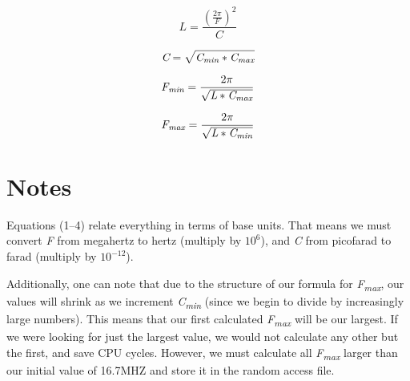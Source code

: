 \documentclass[12pt]{article}
\begin{document}
    \par %

    \begin{equation}
        \textit{L} = \frac{(\frac{2\pi}{\textit{F}})^2}{\textit{C}}
    \end{equation}

    \begin{equation}
        \textit{C} = \sqrt{\textit{C\textsubscript{min}}*\textit{C\textsubscript{max}}}
    \end{equation}

    \begin{equation}
        \textit{F\textsubscript{min}} = \frac{2\pi}{\sqrt{\textit{L}*\textit{C\textsubscript{max}}}}
    \end{equation}

    \begin{equation}
        \textit{F\textsubscript{max}} = \frac{2\pi}{\sqrt{\textit{L}*\textit{C\textsubscript{min}}}}
    \end{equation}


\section*{Notes}
    Equations (1--4) relate everything in terms of base units. That means we must convert \textit{F} from megahertz to hertz (multiply by $10^6$), and \textit{C} from picofarad to farad (multiply by $10^{-12}$).

    \par Additionally, one can note that due to the structure of our formula for \textit{F\textsubscript{max}}, our values will shrink as we increment \textit{C\textsubscript{min}} (since we begin to divide by increasingly large numbers). This means that our first calculated  \textit{F\textsubscript{max}} will be our largest. If we were looking for just the largest value, we would not calculate any other but the first, and save CPU cycles. However, we must calculate all \textit{F\textsubscript{max}} larger than our initial value of 16.7MHZ and store it in the random access file.
\end{document}
